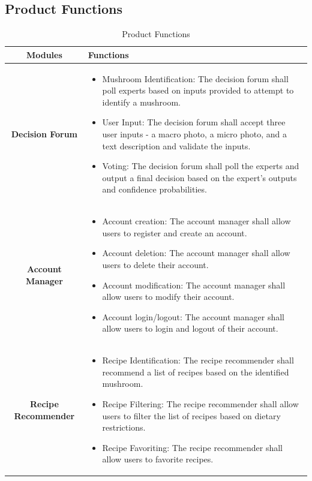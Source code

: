 \documentclass{article}
\begin{document}
\subsection{Product Functions}
\label{sub:product_functions}

\begin{table}[H]
	\centering
	
	\label{tab:product_functions}
	\begin{tabular}{|c|p{10cm}|}
		\hline
		\textbf{Modules} & \textbf{Functions} \\
		\hline
		\textbf{Decision Forum} &
		\vspace{-15pt}
		\begin{itemize}
			\item Mushroom Identification: The decision forum shall poll experts based on inputs provided to attempt to identify a mushroom.
			\item User Input: The decision forum shall accept three user inputs - a macro photo, a micro photo, and a text description and validate the inputs.
			\item Voting: The decision forum shall poll the experts and output a final decision based on the expert's outputs and confidence probabilities.
		\end{itemize} \\
		\hline
		\textbf{Account Manager} & 
		\vspace{-15pt}
		\begin{itemize}
			\item Account creation: The account manager shall allow users to register and create an account.
			\item Account deletion: The account manager shall allow users to delete their account.
			\item Account modification: The account manager shall allow users to modify their account.
			\item Account login/logout: The account manager shall allow users to login and logout of their account.
		\end{itemize} \\
		\hline
		\textbf{Recipe Recommender} & 
		\vspace{-15pt}
		\begin{itemize}
			\item Recipe Identification: The recipe recommender shall recommend a list of recipes based on the identified mushroom.
			\item Recipe Filtering: The recipe recommender shall allow users to filter the list of recipes based on dietary restrictions.
			\item Recipe Favoriting: The recipe recommender shall allow users to favorite recipes.
		\end{itemize} \\
		\hline
	\end{tabular}
	\caption{Product Functions}
\end{table}
\end{document}
